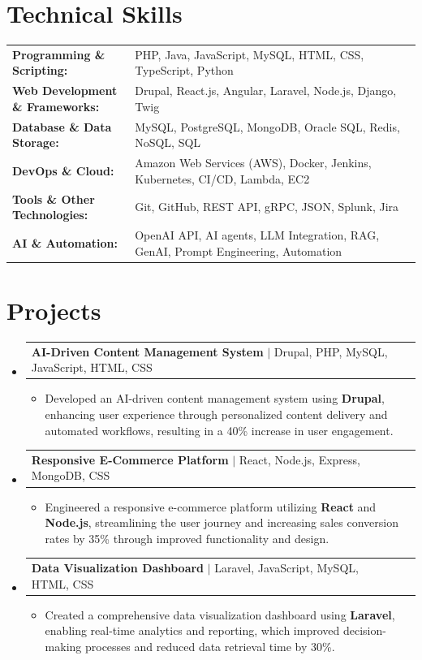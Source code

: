 \documentclass[letterpaper,10pt]{article}
\makeatletter
\newcommand{\resumeItem}[1]{
  \item{\fontsize{8pt}{9pt}\selectfont
    #1 \vspace{-3pt}
  }
}
\newcommand{\resumeProjectHeading}[2]{
    \item
    \begin{tabular*}{1.001\textwidth}{l@{\extracolsep{\fill}}r}
      \fontsize{8.5pt}{10pt}#1 & \textbf{\fontsize{8.5pt}{10pt} #2}\\
    \end{tabular*}\vspace{-7pt}
}
\newcommand{\resumeSubHeadingListStart}{\begin{itemize}[leftmargin=0pt, label={}]}
\newcommand{\resumeSubHeadingListEnd}{\end{itemize}}
\newcommand{\resumeItemListStart}{\begin{itemize}[leftmargin=*]}
\newcommand{\resumeItemListEnd}{\end{itemize}\vspace{-5pt}}
\makeatother
\begin{document}
\section{Technical Skills}
        \vspace{-14pt}
        \begin{table}[h]
            \fontsize{8pt}{9pt}\selectfont
            \begin{tabular}{p{0.3\linewidth} p{0.7\linewidth}}
                \textbf{Programming \& Scripting:} & PHP, Java, JavaScript, MySQL, HTML, CSS, TypeScript, Python \\
                \textbf{Web Development \& Frameworks:} & Drupal, React.js, Angular, Laravel, Node.js, Django, Twig \\
                \textbf{Database \& Data Storage:} & MySQL, PostgreSQL, MongoDB, Oracle SQL, Redis, NoSQL, SQL \\
                \textbf{DevOps \& Cloud:} & Amazon Web Services (AWS), Docker, Jenkins, Kubernetes, CI/CD, Lambda, EC2 \\
                \textbf{Tools \& Other Technologies:} & Git, GitHub, REST API, gRPC, JSON, Splunk, Jira \\
                \textbf{AI \& Automation:} & OpenAI API, AI agents, LLM Integration, RAG, GenAI, Prompt Engineering, Automation \\
            \end{tabular}
        \end{table}
 \vspace{-18pt}

\section{Projects}
    \vspace{-5pt}
    \resumeSubHeadingListStart
          \resumeProjectHeading
            {\textbf{AI-Driven Content Management System} $|$ Drupal, PHP, MySQL, JavaScript, HTML, CSS}{}
            \resumeItemListStart
                \resumeItem{Developed an AI-driven content management system using \textbf{Drupal}, enhancing user experience through personalized content delivery and automated workflows, resulting in a 40\% increase in user engagement.}
            \resumeItemListEnd
        \vspace{-12pt}
    
        \resumeProjectHeading
            {\textbf{Responsive E-Commerce Platform} $|$ React, Node.js, Express, MongoDB, CSS}{}
        \resumeItemListStart
                \resumeItem{Engineered a responsive e-commerce platform utilizing \textbf{React} and \textbf{Node.js}, streamlining the user journey and increasing sales conversion rates by 35\% through improved functionality and design.}
        \resumeItemListEnd
      \vspace{-12pt}
      \resumeProjectHeading
        {\textbf{Data Visualization Dashboard} $|$ Laravel, JavaScript, MySQL, HTML, CSS}{}
    \resumeItemListStart
            \resumeItem{Created a comprehensive data visualization dashboard using \textbf{Laravel}, enabling real-time analytics and reporting, which improved decision-making processes and reduced data retrieval time by 30\%.}
    \resumeItemListEnd
    \resumeSubHeadingListEnd
\end{document}
